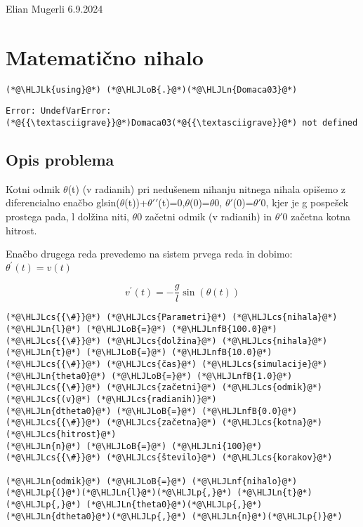 \documentclass[12pt,a4paper]{article}
\newcommand{\HLJLk}[1]{\textcolor[RGB]{148,91,176}{\textbf{#1}}}
\newcommand{\HLJLn}[1]{#1}
\newcommand{\HLJLnf}[1]{\textcolor[RGB]{66,102,213}{#1}}
\newcommand{\HLJLnfB}[1]{\textcolor[RGB]{59,151,46}{#1}}
\newcommand{\HLJLni}[1]{\textcolor[RGB]{59,151,46}{#1}}
\newcommand{\HLJLoB}[1]{\textcolor[RGB]{102,102,102}{\textbf{#1}}}
\newcommand{\HLJLp}[1]{#1}
\newcommand{\HLJLcs}[1]{\textcolor[RGB]{153,153,119}{\textit{#1}}}
\begin{document}
Elian Mugerli 6.9.2024

\section{Matematično nihalo}

\begin{lstlisting}
(*@\HLJLk{using}@*) (*@\HLJLoB{.}@*)(*@\HLJLn{Domaca03}@*)
\end{lstlisting}

\begin{lstlisting}
Error: UndefVarError: (*@{{\textasciigrave}}@*)Domaca03(*@{{\textasciigrave}}@*) not defined
\end{lstlisting}


\subsection{Opis problema}
Kotni odmik \ensuremath{\theta}(t) (v radianih) pri nedušenem nihanju nitnega nihala opišemo z diferencialno enačbo glsin(\ensuremath{\theta}(t))+\ensuremath{\theta}\ensuremath{\prime}\ensuremath{\prime}(t)=0,\ensuremath{\theta}(0)=\ensuremath{\theta}0, \ensuremath{\theta}\ensuremath{\prime}(0)=\ensuremath{\theta}\ensuremath{\prime}0, kjer je g pospešek prostega pada, l dolžina niti, \ensuremath{\theta}0 začetni odmik (v radianih) in \ensuremath{\theta}\ensuremath{\prime}0 začetna kotna hitrost.


Enačbo drugega reda prevedemo na sistem prvega reda in dobimo: $\theta^{\prime}(t) = v(t)$

\[
v^{\prime}(t) = -\frac{g}{l} \sin(\theta(t))
\]

\begin{lstlisting}
(*@\HLJLcs{{\#}}@*) (*@\HLJLcs{Parametri}@*) (*@\HLJLcs{nihala}@*)
(*@\HLJLn{l}@*) (*@\HLJLoB{=}@*) (*@\HLJLnfB{100.0}@*)       (*@\HLJLcs{{\#}}@*) (*@\HLJLcs{dolžina}@*) (*@\HLJLcs{nihala}@*)
(*@\HLJLn{t}@*) (*@\HLJLoB{=}@*) (*@\HLJLnfB{10.0}@*)      (*@\HLJLcs{{\#}}@*) (*@\HLJLcs{čas}@*) (*@\HLJLcs{simulacije}@*)
(*@\HLJLn{theta0}@*) (*@\HLJLoB{=}@*) (*@\HLJLnfB{1.0}@*)  (*@\HLJLcs{{\#}}@*) (*@\HLJLcs{začetni}@*) (*@\HLJLcs{odmik}@*) (*@\HLJLcs{(v}@*) (*@\HLJLcs{radianih)}@*)
(*@\HLJLn{dtheta0}@*) (*@\HLJLoB{=}@*) (*@\HLJLnfB{0.0}@*) (*@\HLJLcs{{\#}}@*) (*@\HLJLcs{začetna}@*) (*@\HLJLcs{kotna}@*) (*@\HLJLcs{hitrost}@*)
(*@\HLJLn{n}@*) (*@\HLJLoB{=}@*) (*@\HLJLni{100}@*)      (*@\HLJLcs{{\#}}@*) (*@\HLJLcs{število}@*) (*@\HLJLcs{korakov}@*)

(*@\HLJLn{odmik}@*) (*@\HLJLoB{=}@*) (*@\HLJLnf{nihalo}@*)(*@\HLJLp{(}@*)(*@\HLJLn{l}@*)(*@\HLJLp{,}@*) (*@\HLJLn{t}@*)(*@\HLJLp{,}@*) (*@\HLJLn{theta0}@*)(*@\HLJLp{,}@*) (*@\HLJLn{dtheta0}@*)(*@\HLJLp{,}@*) (*@\HLJLn{n}@*)(*@\HLJLp{)}@*)
\end{lstlisting}
\end{document}
